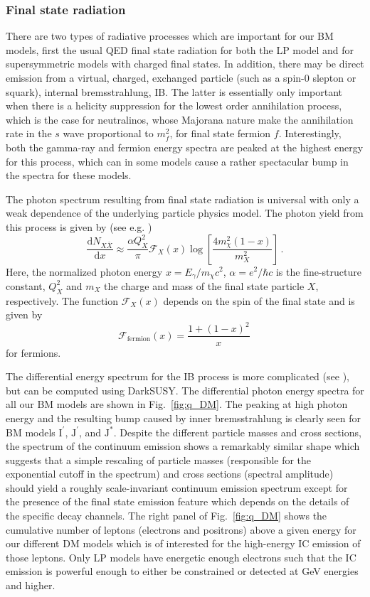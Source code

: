 \documentclass[10pt,aps,pra,reprint,amsmath,amsfonts,amssymb,showpacs,nofootinbib,floatfix]{revtex4-1}
\newcommand{\rmn}{\mathrm}
\newcommand{\Ip}{\rmn{I}^\prime}
\newcommand{\Js}{\rmn{J}^*}
\newcommand{\Jp}{\rmn{J}^\prime}
\newcommand{\dd}{\rmn{d}}
\newcommand{\eg}{E_\gamma}
\begin{document}
\subsubsection{Final state radiation}
There are two types of radiative processes which are important for our
BM models, first the usual QED final state radiation for both the LP
model and for supersymmetric models with charged final states. In
addition, there may be direct emission from a virtual, charged,
exchanged particle (such as a spin-0 slepton or squark), internal
bremsstrahlung, IB. The latter is essentially only important when
there is a helicity suppression for the lowest order annihilation
process, which is the case for neutralinos, whose Majorana nature make
the annihilation rate in the $s$ wave proportional to $m_f^2$, for
final state fermion $f$. Interestingly, both the gamma-ray and fermion
energy spectra are peaked at the highest energy for this process,
which can in some models cause a rather spectacular bump in the
spectra for these models.

The photon spectrum resulting from final state radiation is universal
with only a weak dependence of the underlying particle physics
model. The photon yield from this process is given by (see
e.g. \cite{2008JHEP...01..049B})
\begin{equation}
\frac{\dd N_{X \bar{X}}}{\dd x} \approx \frac{\alpha Q_X^2}{\pi}
\mathcal{F}_X(x) \log\left[\frac{4 m_\chi^2\left(1-x\right)}{m_X^2}\right]\,.
\end{equation}
Here, the normalized photon energy $x=\eg/m_\chi c^2$,
$\alpha =e^2/\hbar c$ is the fine-structure constant,
$Q_X^2$ and $m_X$ the
charge and mass of the final state particle $X$, respectively. The function
$\mathcal{F}_X(x)$ depends on the spin of the final state and is given
by
\begin{equation}
\mathcal{F}_\rmn{fermion}(x) = \frac{1+\left(1-x\right)^2}{x}\,
\end{equation}
for fermions.

The differential energy spectrum for the IB process is more
complicated (see \cite{1989PhLB..225..372B,2008JHEP...01..049B}), but
can be computed using {\sc DarkSUSY}. The differential photon energy
spectra for all our BM models are shown in Fig.~\ref{fig:q_DM}. The
peaking at high photon energy and the resulting bump caused by inner
bremsstrahlung is clearly seen for BM models $\Ip$, $\Jp$, and
$\Js$. Despite the different particle masses and cross sections, the
spectrum of the continuum emission shows a remarkably similar shape
which suggests that a simple rescaling of particle masses (responsible
for the exponential cutoff in the spectrum) and cross sections
(spectral amplitude) should yield a roughly scale-invariant continuum
emission spectrum except for the presence of the final state emission
feature which depends on the details of the specific decay
channels. The right panel of Fig.~\ref{fig:q_DM} shows the cumulative
number of leptons (electrons and positrons) above a given energy for
our different DM models which is of interested for the high-energy IC
emission of those leptons. Only LP models have energetic enough
electrons such that the IC emission is powerful enough to either be
constrained or detected at GeV energies and higher.
\end{document}
